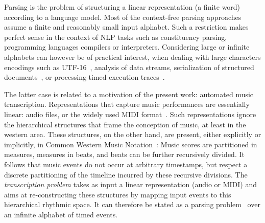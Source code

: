 %
%
Parsing is the problem
of structuring a linear representation
(a finite word) according to a language model. %
%
Most of the context-free parsing approaches~\cite{GruneJacobs08parsing}
assume a finite and reasonably small input alphabet. %
Such a restriction makes perfect sense in the context of
NLP tasks such as constituency parsing,
programming languages compilers or interpreters.
Considering large or infinite alphabets can however be of
practical interest, when dealing with large characters encodings such as UTF-16~\cite{dAntoni21CACM},
%
analysis of data streams, serialization of structured documents~\cite{Segoufin06csl,NevenSchwentickVianu04FSMinfinite},
or processing timed execution traces~\cite{Bouyer03algebraic}.
%

The latter case is related to a motivation  of  the present work:
automated music transcription. Representations that capture  music performances
are essentially linear:
audio files, or the widely used
MIDI format~\cite{Selfridge-Field97beyondMIDI}. %
Such representations ignore the hierarchical structures that frame the
conception of music, at least in the western area. These structures, on the other hand,
are present, either explicitly  or implicitly,
in Common Western Music Notation~\cite{Gould11Notation}:
Music scores are partitioned in measures,
measures in beats, and beats can be further recursively divided.
It follows that music events do not occur at arbitrary timestamps,
but respect a discrete partitioning of the  timeline incurred by
these recursive divisions.
The \emph{transcription problem} takes
as input a linear representation (audio or MIDI) and aims at re-constructing
these structures
by mapping input events to this hierarchical rhythmic space.
It can therefore be stated as a parsing problem~\cite{foscarin:hal-01988990}
over an infinite alphabet of timed events.

